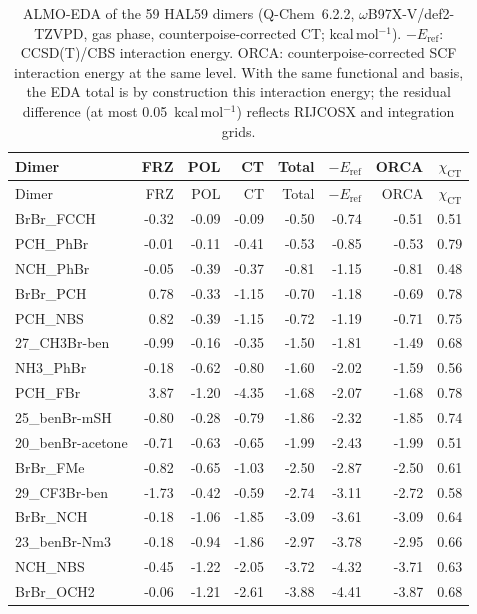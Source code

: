 {\scriptsize
\setlength{\tabcolsep}{3pt}
\begin{longtable}{lrrrrrrr}
\caption{ALMO-EDA of the 59 HAL59 dimers (Q-Chem~6.2.2, $\omega$B97X-V/def2-TZVPD, gas phase, counterpoise-corrected CT; kcal\,mol$^{-1}$). $-E_\mathrm{ref}$: CCSD(T)/CBS interaction energy. ORCA: counterpoise-corrected SCF interaction energy at the same level. With the same functional and basis, the EDA total is by construction this interaction energy; the residual difference (at most 0.05~kcal\,mol$^{-1}$) reflects RIJCOSX and integration grids.}\label{tab:qmeda}\\
\toprule
Dimer & FRZ & POL & CT & Total & $-E_\mathrm{ref}$ & ORCA & $\chi_\mathrm{CT}$\\
\midrule
\endfirsthead
\toprule
Dimer & FRZ & POL & CT & Total & $-E_\mathrm{ref}$ & ORCA & $\chi_\mathrm{CT}$\\
\midrule
\endhead
\bottomrule
\endlastfoot
BrBr\_FCCH & -0.32 & -0.09 & -0.09 & -0.50 & -0.74 & -0.51 & 0.51\\
PCH\_PhBr & -0.01 & -0.11 & -0.41 & -0.53 & -0.85 & -0.53 & 0.79\\
NCH\_PhBr & -0.05 & -0.39 & -0.37 & -0.81 & -1.15 & -0.81 & 0.48\\
BrBr\_PCH & 0.78 & -0.33 & -1.15 & -0.70 & -1.18 & -0.69 & 0.78\\
PCH\_NBS & 0.82 & -0.39 & -1.15 & -0.72 & -1.19 & -0.71 & 0.75\\
27\_CH3Br-ben & -0.99 & -0.16 & -0.35 & -1.50 & -1.81 & -1.49 & 0.68\\
NH3\_PhBr & -0.18 & -0.62 & -0.80 & -1.60 & -2.02 & -1.59 & 0.56\\
PCH\_FBr & 3.87 & -1.20 & -4.35 & -1.68 & -2.07 & -1.68 & 0.78\\
25\_benBr-mSH & -0.80 & -0.28 & -0.79 & -1.86 & -2.32 & -1.85 & 0.74\\
20\_benBr-acetone & -0.71 & -0.63 & -0.65 & -1.99 & -2.43 & -1.99 & 0.51\\
BrBr\_FMe & -0.82 & -0.65 & -1.03 & -2.50 & -2.87 & -2.50 & 0.61\\
29\_CF3Br-ben & -1.73 & -0.42 & -0.59 & -2.74 & -3.11 & -2.72 & 0.58\\
BrBr\_NCH & -0.18 & -1.06 & -1.85 & -3.09 & -3.61 & -3.09 & 0.64\\
23\_benBr-Nm3 & -0.18 & -0.94 & -1.86 & -2.97 & -3.78 & -2.95 & 0.66\\
NCH\_NBS & -0.45 & -1.22 & -2.05 & -3.72 & -4.32 & -3.71 & 0.63\\
BrBr\_OCH2 & -0.06 & -1.21 & -2.61 & -3.88 & -4.41 & -3.87 & 0.68\\

\end{longtable}}
